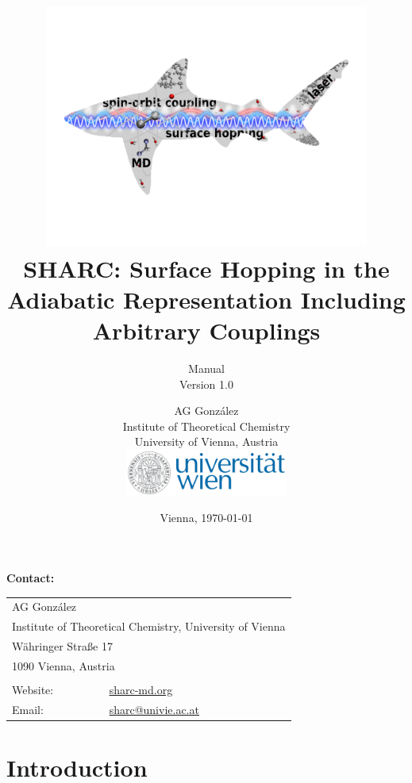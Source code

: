 \documentclass[a4paper,11pt,DIV=15,openany,twoside=false]{scrbook}
\title{\hspace{1cm}\includegraphics[width=0.8\textwidth,keepaspectratio=true]{img/sharc.pdf}\\[0.5cm]
    SHARC: Surface Hopping in the Adiabatic Representation Including Arbitrary Couplings}
\subtitle{Manual\\[1cm]Version 1.0}
\date{Vienna, \today}
\author{AG Gonz\'alez\\
Institute of Theoretical Chemistry\\
University of Vienna, Austria
\vspace{1cm}
\\
\includegraphics[width=0.4\textwidth,keepaspectratio=true]{img/univie.pdf}}
\begin{document}
\tpage


\begin{shaded}
  \textbf{Contact:}

  \begin{tabular}{ll}
    \\
    \multicolumn{2}{l}{AG Gonz\'alez}\\
    \multicolumn{2}{l}{Institute of Theoretical Chemistry, University of Vienna}\\
    \multicolumn{2}{l}{W\"ahringer Stra\ss{}e 17}\\
    \multicolumn{2}{l}{1090 Vienna, Austria}\\
    \\
    Website: &\href{http://sharc-md.org}{sharc-md.org}\\
    Email: &\href{mailto:sharc@univie.ac.at}{sharc@univie.ac.at}\\
  \end{tabular}
\end{shaded}

\newpage
{}
\ohead{\rightmark}
\ofoot[\pagemark]{\pagemark}


\tableofcontents


\chapter{Introduction}
\end{document}
